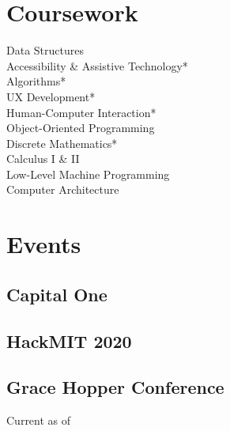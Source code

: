 \documentclass[]{hieudo-build}
\begin{document}
\begin{minipage}[t]{0.34\textwidth}
\section{Coursework}
Data Structures \\
Accessibility \& Assistive Technology* \\
Algorithms* \\
UX Development* \\
Human-Computer Interaction* \\
Object-Oriented Programming \\
Discrete Mathematics* \\
Calculus I \& II \\
Low-Level Machine Programming \\
Computer Architecture \\
\smallsectionsep
{}
\sectionsep

\section{Events}
\subsection{Capital One} 
\smallsectionsep
\subsection{HackMIT 2020}
\smallsectionsep
\subsection{Grace Hopper Conference}

\vspace{3.5em} %
Current as of 

%
%
\end{minipage} 
\end{document}

